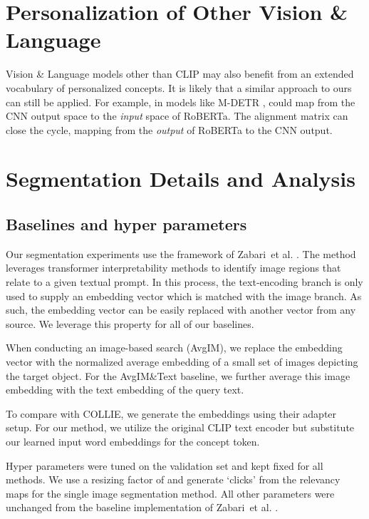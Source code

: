 \documentclass[runningheads]{llncs}
\newcommand{\etal}{{{et al}. }}
\begin{document}
\section{Personalization of Other Vision \& Language}
\label{approch_extension}
Vision \& Language models other than CLIP may also benefit from an extended vocabulary of personalized concepts. It is likely that a similar approach to ours can still be applied. For example, in models like M-DETR \cite{kamath2021mdetr},  could map from the CNN output space to the \textit{input} space of RoBERTa. The alignment matrix  can close the cycle, mapping from the \textit{output} of RoBERTa to the CNN output.

\section{Segmentation Details and Analysis}

\subsection{Baselines and hyper parameters}

Our segmentation experiments use the framework of Zabari~\etal\cite{zabari2021semantic}. The method leverages transformer interpretability methods to identify image regions that relate to a given textual prompt. In this process, the text-encoding branch is only used to supply an embedding vector which is matched with the image branch. As such, the embedding vector can be easily replaced with another vector from any source. We leverage this property for all of our baselines.

When conducting an image-based search (AvgIM), we replace the embedding vector with the normalized average embedding of a small set of images depicting the target object. For the AvgIM\&Text baseline, we further average this image embedding with the text embedding of the query text.

To compare with COLLIE, we generate the embeddings using their adapter setup. For our method, we utilize the original CLIP text encoder but substitute our learned input word embeddings for the concept token.

Hyper parameters were tuned on the validation set and kept fixed for all methods. We use a resizing factor of  and generate  `clicks' from the relevancy maps for the single image segmentation method. All other parameters were unchanged from the baseline implementation of Zabari~\etal\cite{zabari2021semantic}.
\end{document}
